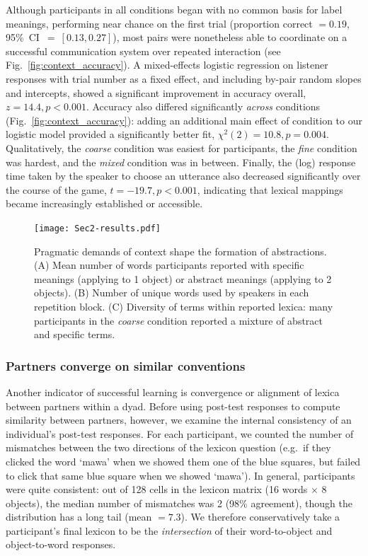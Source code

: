 Although participants in all conditions began with no common basis for label meanings, performing near chance on the first trial (proportion correct $= 0.19$, 95\%~CI~$=~[0.13, 0.27]$), most pairs were nonetheless able to coordinate on a successful communication system over repeated interaction (see Fig.\ \ref{fig:context_accuracy}). 
A mixed-effects logistic regression on listener responses with trial number as a fixed effect, and including by-pair random slopes and intercepts, showed a significant improvement in accuracy overall, $z = 14.4, p < 0.001$. 
Accuracy also differed significantly \emph{across} conditions (Fig.\ \ref{fig:context_accuracy}): adding an additional main effect of condition to our logistic model provided a significantly better fit, $\chi^2(2) = 10.8, p = 0.004$. 
Qualitatively, the \emph{coarse} condition was easiest for participants, the \emph{fine} condition was hardest, and the \emph{mixed} condition was in between.
Finally, the (log) response time taken by the speaker to choose an utterance also decreased significantly over the course of the game, $t = -19.7, p < 0.001$, indicating that lexical mappings became increasingly established or accessible.



\begin{figure}[t]
\begin{center}
\texttt{[image: Sec2-results.pdf]}
\caption{Pragmatic demands of context shape the formation of abstractions. (A) Mean number of words participants reported with specific meanings (applying to 1 object) or abstract meanings (applying to 2 objects). (B) Number of unique words used by speakers in each repetition block. (C)  Diversity of terms within reported lexica: many participants in the \emph{coarse} condition reported a mixture of abstract and specific terms. }
\label{fig:lexiconContent}
\end{center}
\end{figure}


\subsubsection{Partners converge on similar conventions}

Another indicator of successful learning is convergence or alignment of lexica between partners within a dyad. 
Before using post-test responses to compute similarity between partners, however, we examine the internal consistency of an individual's post-test responses. 
For each participant, we counted the number of mismatches between the two directions of the lexicon question (e.g.\ if they clicked the word `mawa' when we showed them one of the blue squares, but failed to click that same blue square when we showed `mawa'). 
In general, participants were quite consistent: out of 128 cells in the lexicon matrix (16 words $\times$ 8 objects), the median number of mismatches was 2 (98\% agreement), though the distribution has a long tail (mean $= 7.3$). 
We therefore conservatively take a participant's final lexicon to be the \emph{intersection} of their word-to-object and object-to-word responses.

